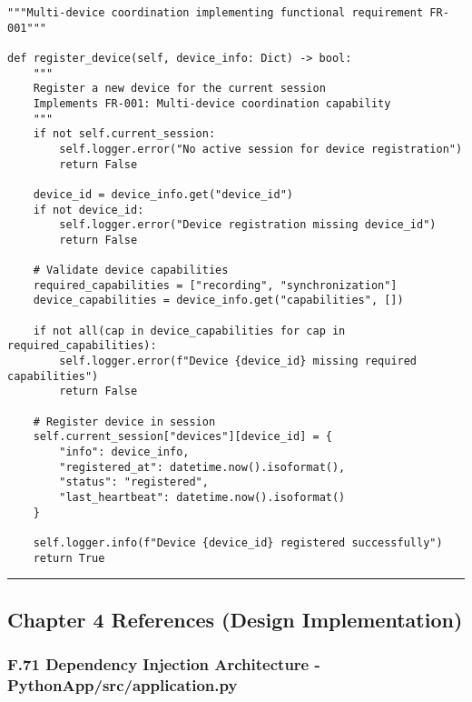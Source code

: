 \documentclass[12pt,a4paper]{article}
\begin{document}
\begin{verbatim}
"""Multi-device coordination implementing functional requirement FR-001"""

def register_device(self, device_info: Dict) -> bool:
    """
    Register a new device for the current session
    Implements FR-001: Multi-device coordination capability
    """
    if not self.current_session:
        self.logger.error("No active session for device registration")
        return False
    
    device_id = device_info.get("device_id")
    if not device_id:
        self.logger.error("Device registration missing device_id")
        return False
    
    # Validate device capabilities
    required_capabilities = ["recording", "synchronization"]
    device_capabilities = device_info.get("capabilities", [])
    
    if not all(cap in device_capabilities for cap in required_capabilities):
        self.logger.error(f"Device {device_id} missing required capabilities")
        return False
    
    # Register device in session
    self.current_session["devices"][device_id] = {
        "info": device_info,
        "registered_at": datetime.now().isoformat(),
        "status": "registered",
        "last_heartbeat": datetime.now().isoformat()
    }
    
    self.logger.info(f"Device {device_id} registered successfully")
    return True
\end{verbatim}

\hrule

\subsection{Chapter 4 References (Design Implementation)}

\subsubsection{F.71 Dependency Injection Architecture - PythonApp/src/application.py}
\end{document}

